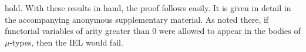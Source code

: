 \documentclass[runningheads]{llncs}
\begin{document}
hold. With these results in hand, the proof follows easily. It is
given in detail in the accompanying anonymous supplementary
material. As noted there, if functorial variables of arity greater
than $0$ were allowed to appear in the bodies of $\mu$-types, then the
IEL would fail.

\begin{comment}
\begin{proof}
By induction on the structure of $\tau$.
\begin{itemize}
\item $\relsem{\Gamma; \emptyset \vdash v}\Eq_{\rho} = \Eq_{\rho} v =
  \Eq_{\rho v} = \Eq_{\setsem{\Gamma; \emptyset \vdash v}\rho}$ where
  $v \in \Gamma$.
\item By definition, $\relsem{\Gamma; \emptyset \vdash
  \Nat^{\overline\alpha} \,F\,G} \Eq_{\rho}$ is the relation on
  $\setsem{\Gamma; \emptyset \vdash \Nat^{\overline\alpha} \,F\,G}
  \rho$ relating $t$ and $t'$ if, for all ${R_1 :
    \rel(A_1,B_1)},...,{R_k : \rel(A_k,B_k)}$, $(t_{\overline{A}},
  t'_{\overline{B}})$ is a morphism from $\relsem{\Gamma;
    \overline\alpha \vdash F} \Eq_{\rho}\overline{[\alpha := R]}$ to
  $\relsem{\Gamma ; \overline\alpha \vdash G}
  \Eq_{\rho}\overline{[\alpha := R]}$ in $\rel$.  To prove that this
  is equal to $\Eq_{\setsem{\Gamma; \emptyset \vdash
      \Nat^{\overline\alpha} \,F\,G} \rho}$ we need to show that
  $(t_{\overline{A}}, t'_{\overline{B}})$ is a morphism from
  $\relsem{\Gamma; \overline\alpha \vdash F}
  \Eq_{\rho}\overline{[\alpha := R]}$ to $\relsem{\Gamma ;
    \overline\alpha \vdash G} \Eq_{\rho}\overline{[\alpha := R]}$ in
  $\rel$ for all ${R_1 : \rel(A_1,B_1)},...,{R_k : \rel(A_k,B_k)}$ if
  and only if $t = t'$ and $(t_{\overline{A}}, t_{\overline{B}})$ is a
  morphism from $\relsem{\Gamma; \overline\alpha \vdash F}
  \Eq_{\rho}\overline{[\alpha := R]}$ to $\relsem{\Gamma ; \overline
    \alpha \vdash G} \Eq_{\rho}\overline{[\alpha := R]}$ in $\rel$ for
  all ${R_1 : \rel(A_1,B_1)}, ...,$ ${R_k : \rel(A_k,B_k)}$. The only
  interesting part of this equivalence is to show that if
  $(t_{\overline{A}}, t'_{\overline{B}})$ is a morphism from
  $\relsem{\Gamma; \overline\alpha \vdash F}
  \Eq_{\rho}\overline{[\alpha := R]}$ to $\relsem{\Gamma ;
    \overline\alpha \vdash G} \Eq_{\rho}\overline{[\alpha := R]}$ in
  $\rel$ for all ${R_1 : \rel(A_1,B_1),}$ $...,{R_k : \rel(A_k,B_k)}$,
  then $t = t'$.  By hypothesis, $(t_{\overline{A}},
  t'_{\overline{A}})$ is a morphism from $\relsem{\Gamma;

\end{comment}
\end{document}
